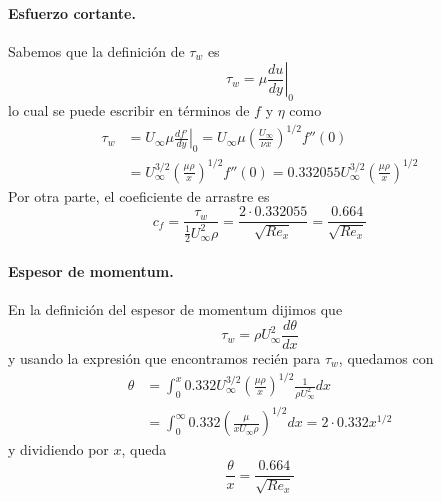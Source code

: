 \paragraph*{Esfuerzo cortante.}
Sabemos que la definición de $\tau_w$ es
%
\begin{equation}
\tau_w = \left.\mu\frac{du}{dy}\right|_0
\end{equation}
%
lo cual se puede escribir en términos de $f$ y $\eta$ como
%
\begin{align}
\tau_w &= \left. U_\infty\mu \frac{df'}{dy}\right|_0 = U_\infty\mu \left(\frac{U_\infty}{\nu x}\right)^{1/2}f''(0) \nonumber\\
&= U_\infty^{3/2}\left(\frac{\mu\rho}{x}\right)^{1/2}f''(0) = 0.332055 U_\infty^{3/2}\left(\frac{\mu\rho}{x}\right)^{1/2} 
\end{align}
%
Por otra parte, el coeficiente de arrastre es
%
\begin{equation}
c_f = \frac{\tau_w}{\frac{1}{2}U_\infty^2\rho} = \frac{2\cdot0.332055}{\sqrt{Re_x}} = \frac{0.664}{\sqrt{Re_x}}
\end{equation}

\paragraph*{Espesor de momentum.}
En la definición del espesor de momentum dijimos que
%
\begin{equation}
\tau_w = \rho U_\infty^2 \frac{d\theta}{dx}
\end{equation}
%
y usando la expresión que encontramos recién para $\tau_w$, quedamos con
%
\begin{align}
\theta &= \int_0^x 0.332 U_\infty^{3/2}\left(\frac{\mu\rho}{x}\right)^{1/2} \frac{1}{\rho U_\infty^2} dx \nonumber\\
&= \int_0^\infty 0.332 \left(\frac{\mu}{xU_\infty\rho}\right)^{1/2} dx = 2\cdot0.332 x^{1/2}
\end{align}
%
y dividiendo por $x$, queda
%
\begin{equation}
\frac{\theta}{x} = \frac{0.664}{\sqrt{Re_x}}
\end{equation}
